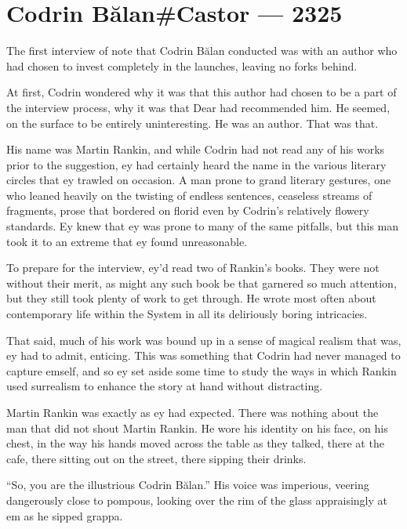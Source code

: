 \hypertarget{codrin-bux103lancastor-2325}{%
\chapter{Codrin Bălan\#Castor — 2325}\label{codrin-bux103lancastor-2325}}

The first interview of note that Codrin Bălan conducted was with an author who had chosen to invest completely in the launches, leaving no forks behind.

At first, Codrin wondered why it was that this author had chosen to be a part of the interview process, why it was that Dear had recommended him. He seemed, on the surface to be entirely uninteresting. He was an author. That was that.

His name was Martin Rankin, and while Codrin had not read any of his works prior to the suggestion, ey had certainly heard the name in the various literary circles that ey trawled on occasion. A man prone to grand literary gestures, one who leaned heavily on the twisting of endless sentences, ceaseless streams of fragments, prose that bordered on florid even by Codrin's relatively flowery standards. Ey knew that ey was prone to many of the same pitfalls, but this man took it to an extreme that ey found unreasonable.

To prepare for the interview, ey'd read two of Rankin's books. They were not without their merit, as might any such book be that garnered so much attention, but they still took plenty of work to get through. He wrote most often about contemporary life within the System in all its deliriously boring intricacies.

That said, much of his work was bound up in a sense of magical realism that was, ey had to admit, enticing. This was something that Codrin had never managed to capture emself, and so ey set aside some time to study the ways in which Rankin used surrealism to enhance the story at hand without distracting.

Martin Rankin was exactly as ey had expected. There was nothing about the man that did not shout Martin Rankin. He wore his identity on his face, on his chest, in the way his hands moved across the table as they talked, there at the cafe, there sitting out on the street, there sipping their drinks.

``So, you are the illustrious Codrin Bălan.'' His voice was imperious, veering dangerously close to pompous, looking over the rim of the glass appraisingly at em as he sipped grappa.

